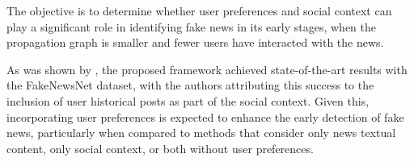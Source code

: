 \documentclass[12pt]{article}
\begin{document}
The objective is to determine whether user preferences and social context can play a 
significant role in identifying fake news in its early stages, 
when the propagation graph is smaller and fewer users have interacted with the news.

As was shown by \cite{dou2021user}, the proposed framework achieved state-of-the-art results
with the FakeNewsNet dataset, with the authors attributing this success to the 
inclusion of user historical posts as part of the social context. 
Given this, incorporating user preferences is expected to enhance the early detection of fake news, 
particularly when compared to methods that consider only news textual content, 
only social context, or both without user preferences.




\end{document}
